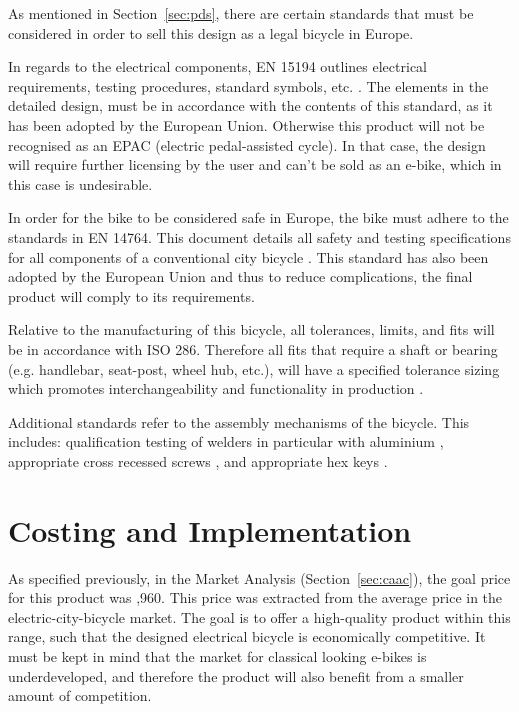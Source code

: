 \documentclass[a4paper,11pt]{article}
\begin{document}
As mentioned in Section~\ref{sec:pds}, there are certain standards that must be considered in order to sell this design as a legal bicycle in Europe.

In regards to the electrical components, EN 15194 outlines electrical requirements, testing procedures, standard symbols, etc. \cite{15194}. The elements in the detailed design, must be in accordance with the contents of this standard, as it has been adopted by the European Union. Otherwise this product will not be recognised as an EPAC (electric pedal-assisted cycle). In that case, the design will require further licensing by the user and can't be sold as an e-bike, which in this case is undesirable.

In order for the bike to be considered safe in Europe, the bike must adhere to the standards in EN 14764. This document details all safety and testing specifications for all components of a conventional city bicycle \cite{14764}. This standard has also been adopted by the European Union and thus to reduce complications, the final product will comply to its requirements.

Relative to the manufacturing of this bicycle, all tolerances, limits, and fits will be in accordance with ISO 286. Therefore all fits that require a shaft or bearing (e.g. handlebar, seat-post, wheel hub, etc.), will have a specified tolerance sizing which promotes interchangeability and functionality in production \cite{286}.

Additional standards refer to the assembly mechanisms of the bicycle. This includes: qualification testing of welders in particular with aluminium \cite{9606}, appropriate cross recessed screws \cite{4757}, and appropriate hex keys \cite{4762}.

\section{Costing and Implementation}
\label{sec:coim}

As specified previously, in the Market Analysis (Section~\ref{sec:caac}), the goal price for this product was ,960. This price was extracted from the average price in the electric-city-bicycle market. The goal is to offer a high-quality product within this range, such that the designed electrical bicycle is economically competitive. It must be kept in mind that the market for classical looking e-bikes is underdeveloped, and therefore the product will also benefit from a smaller amount of competition.  
\end{document}
